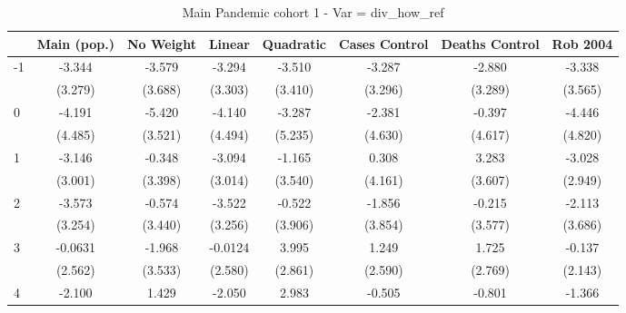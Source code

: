 \documentclass{article}
\begin{document}
{
\def\sym#1{\ifmmode^{#1}\else\(^{#1}\)\fi}
\begin{longtable}{l*{7}{c}}
\caption{Main Pandemic cohort 1 - Var = div\_how\_ref}\\
\hline\hline\endfirsthead\hline\endhead\hline\endfoot\endlastfoot
                &\multicolumn{1}{c}{Main (pop.)}&\multicolumn{1}{c}{No Weight}&\multicolumn{1}{c}{Linear}&\multicolumn{1}{c}{Quadratic}&\multicolumn{1}{c}{Cases Control}&\multicolumn{1}{c}{Deaths Control}&\multicolumn{1}{c}{Rob 2004}\\
\hline
-1              &   -3.344         &   -3.579         &   -3.294         &   -3.510         &   -3.287         &   -2.880         &   -3.338         \\
                &  (3.279)         &  (3.688)         &  (3.303)         &  (3.410)         &  (3.296)         &  (3.289)         &  (3.565)         \\
0               &   -4.191         &   -5.420         &   -4.140         &   -3.287         &   -2.381         &   -0.397         &   -4.446         \\
                &  (4.485)         &  (3.521)         &  (4.494)         &  (5.235)         &  (4.630)         &  (4.617)         &  (4.820)         \\
1               &   -3.146         &   -0.348         &   -3.094         &   -1.165         &    0.308         &    3.283         &   -3.028         \\
                &  (3.001)         &  (3.398)         &  (3.014)         &  (3.540)         &  (4.161)         &  (3.607)         &  (2.949)         \\
2               &   -3.573         &   -0.574         &   -3.522         &   -0.522         &   -1.856         &   -0.215         &   -2.113         \\
                &  (3.254)         &  (3.440)         &  (3.256)         &  (3.906)         &  (3.854)         &  (3.577)         &  (3.686)         \\
3               &  -0.0631         &   -1.968         &  -0.0124         &    3.995         &    1.249         &    1.725         &   -0.137         \\
                &  (2.562)         &  (3.533)         &  (2.580)         &  (2.861)         &  (2.590)         &  (2.769)         &  (2.143)         \\
4               &   -2.100         &    1.429         &   -2.050         &    2.983         &   -0.505         &   -0.801         &   -1.366         \\

\end{longtable}}
\end{document}
